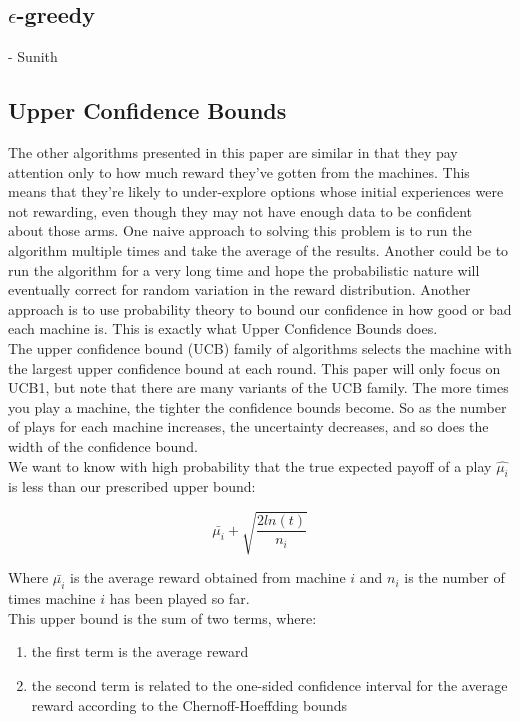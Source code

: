 \documentclass{article}
\begin{document}
\subsection{$\epsilon$-greedy}

- Sunith

\subsection{Upper Confidence Bounds}

The other algorithms presented in this paper are similar in that they pay attention only to how much reward they’ve gotten from the machines. This means that they're likely to under-explore options whose initial experiences were not rewarding, even though they may not have enough data to be confident about those arms. One naive approach to solving this problem is to run the algorithm multiple times and take the average of the results. Another could be to run the algorithm for a very long time and hope the probabilistic nature will eventually correct for random variation in the reward distribution. Another approach is to use probability theory to bound our confidence in how good or bad each machine is. This is exactly what Upper Confidence Bounds does.\\

The upper confidence bound (UCB) family of algorithms selects the machine with the largest upper confidence bound at each round. This paper will only focus on UCB1, but note that there are many variants of the UCB family. The more times you play a machine, the tighter the confidence bounds become. So as the number of plays for each machine increases, the uncertainty decreases, and so does the width of the confidence bound.\\

We want to know with high probability that the true expected payoff of a play $\hat{\mu_i}$ is less than our prescribed upper bound:

$$\bar{\mu_{i}} + \sqrt{\frac{2 ln (t)}{n_i}}$$

Where $\bar{\mu_{i}}$ is the average reward obtained from machine $i$ and $n_i$ is the number of times machine $i$ has been played so far.\\

This upper bound is the sum of two terms, where:

\begin{enumerate}
\item the first term is the average reward
\item the second term is related to the one-sided confidence interval for the average reward according to the Chernoff-Hoeffding bounds
\end{enumerate}
\end{document}
